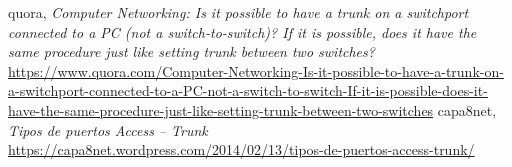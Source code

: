 \documentclass[onecolumn,11pts]{IEEEtran}
\begin{document}
\clearpage

\begin{thebibliography}{15}

  quora,
  \emph{Computer Networking: Is it possible to have a trunk on a switchport connected to a PC (not a switch-to-switch)? If it is possible, does it have the same procedure just like setting trunk between two switches? }
  \url{https://www.quora.com/Computer-Networking-Is-it-possible-to-have-a-trunk-on-a-switchport-connected-to-a-PC-not-a-switch-to-switch-If-it-is-possible-does-it-have-the-same-procedure-just-like-setting-trunk-between-two-switches}
  capa8net,
  \emph{Tipos de puertos Access – Trunk}
  \url{https://capa8net.wordpress.com/2014/02/13/tipos-de-puertos-access-trunk/}

\end{thebibliography}
\end{document}
